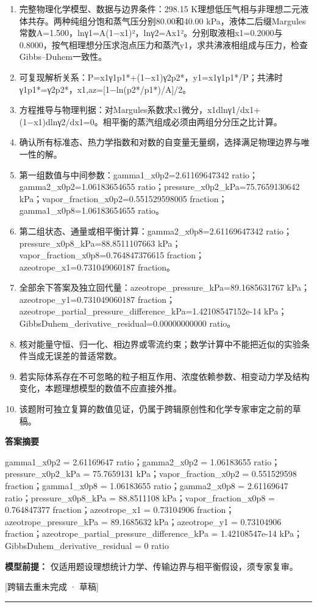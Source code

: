 \documentclass[UTF8,11pt,a4paper]{ctexart}
\begin{document}
\begin{enumerate}
\item 完整物理化学模型、数据与边界条件：298.15 K理想低压气相与非理想二元液体共存。两种纯组分饱和蒸气压分别80.00和40.00 kPa，液体二后缀Margules常数A=1.500，lnγ1=A(1−x1)²，lnγ2=Ax1²。分别取液相x1=0.2000与0.8000，按气相理想分压求泡点压力和蒸汽y1，求共沸液相组成与压力，检查Gibbs–Duhem一致性。
\item 可复现解析关系：P=x1γ1p1*+(1−x1)γ2p2*，y1=x1γ1p1*/P；共沸时γ1p1*=γ2p2*，x1,az=[1−ln(p2*/p1*)/A]/2。
\item 方程推导与物理判据：对Margules系数求x1微分，x1dlnγ1/dx1+(1−x1)dlnγ2/dx1=0。相平衡的蒸汽组成必须由两组分分压之比计算。
\item 确认所有标准态、热力学指数和对数的自变量无量纲，选择满足物理边界与唯一性的解。
\item 第一组数值与中间参数：gamma1\_x0p2=2.61169647342 ratio；gamma2\_x0p2=1.06183654655 ratio；pressure\_x0p2\_kPa=75.7659130642 kPa；vapor\_fraction\_x0p2=0.551529598005 fraction；gamma1\_x0p8=1.06183654655 ratio。
\item 第二组状态、通量或相平衡计算：gamma2\_x0p8=2.61169647342 ratio；pressure\_x0p8\_kPa=88.8511107663 kPa；vapor\_fraction\_x0p8=0.764847376615 fraction；azeotrope\_x1=0.731049060187 fraction。
\item 全部余下答案及独立回代量：azeotrope\_pressure\_kPa=89.1685631767 kPa；azeotrope\_y1=0.731049060187 fraction；azeotrope\_partial\_pressure\_difference\_kPa=1.42108547152e-14 kPa；GibbsDuhem\_derivative\_residual=0.00000000000 ratio。
\item 核对能量守恒、归一化、相边界或零流约束；数学计算中不能把近似的实验条件当成无误差的普适常数。
\item 若实际体系存在不可忽略的粒子相互作用、浓度依赖参数、相变动力学及结构变化，本题理想模型的数值不应直接外推。
\item 该题附可独立复算的数值见证，仍属于跨辑原创性和化学专家审定之前的草稿。
\end{enumerate}
\noindent\textbf{答案摘要}\par
gamma1\_x0p2 = 2.61169647 ratio；gamma2\_x0p2 = 1.06183655 ratio；pressure\_x0p2\_kPa = 75.7659131 kPa；vapor\_fraction\_x0p2 = 0.551529598 fraction；gamma1\_x0p8 = 1.06183655 ratio；gamma2\_x0p8 = 2.61169647 ratio；pressure\_x0p8\_kPa = 88.8511108 kPa；vapor\_fraction\_x0p8 = 0.764847377 fraction；azeotrope\_x1 = 0.73104906 fraction；azeotrope\_pressure\_kPa = 89.1685632 kPa；azeotrope\_y1 = 0.73104906 fraction；azeotrope\_partial\_pressure\_difference\_kPa = 1.42108547e-14 kPa；GibbsDuhem\_derivative\_residual = 0 ratio\par
\noindent\textbf{模型前提：}
仅适用题设理想统计力学、传输边界与相平衡假设，须专家复审。\par
\noindent\textcolor{red!65!black}{[跨辑去重未完成 · 草稿]} \par
\medskip\hrule\medskip
{}
\end{document}
